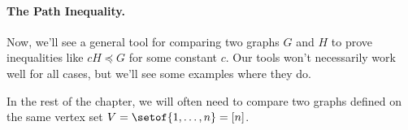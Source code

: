 





\paragraph{The Path Inequality.}
Now, we'll see a general tool
for comparing two graphs $G$ and $H$ to prove inequalities like $c H
\preceq G$ for some constant $c$.
Our tools won't necessarily work well for all cases, but we'll see
some examples where they do.


In the rest of the chapter, we will often need to compare two graphs
defined on the same vertex set $V = \setof{1,\ldots,n} = [n]$.

